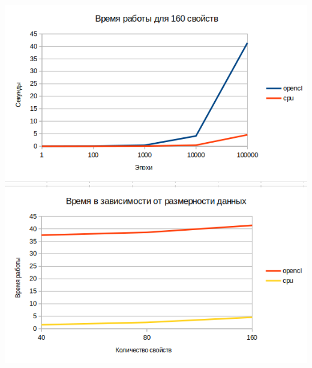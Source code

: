 \documentclass[a4paper,14pt]{extarticle}
\begin{document}
\begin{center}
    \includegraphics[width=140mm]{exp_160}\\
    \includegraphics[width=140mm]{exp_diff_props}\\
\end{center}
\end{document}
